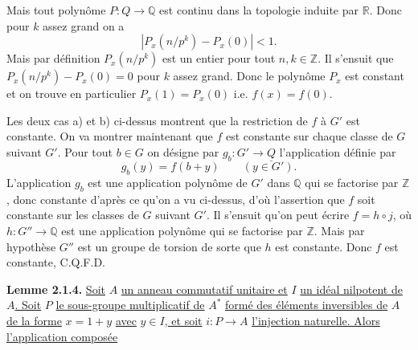 
Mais tout polynôme $P:Q\to\mathbb Q$ est continu dans la topologie induite par $\mathbb R$. Donc pour $k$ assez grand on a
\[
|P_x(n/p^k)-P_x(0)|<1.
\]
Mais par définition $P_x(n/p^k)$ est un entier pour tout $n,k\in\mathbb Z$. Il s'ensuit que $P_x(n/p^k)-P_x(0)=0$ pour $k$ assez grand. Donc le polynôme $P_x$ est constant et on trouve en particulier $P_x(1)=P_x(0)$ i.e. $f(x)=f(0)$.

Les deux cas a) et b) ci-dessus montrent que la restriction de $f$ à $G'$ est constante. On va montrer maintenant que $f$ est constante sur chaque classe de $G$ suivant $G'$. Pour tout $b\in G$ on désigne par $g_b:G'\to\underline{Q}$ l'application définie par
\[
g_b(y)=f(b+y)\qquad(y\in G').
\]
L'application $g_b$ est une application polynôme de $G'$ dans $\mathbb Q$ qui se factorise par $\mathbb Z$, donc constante d'après ce qu'on a vu ci-dessus, d'où l'assertion que $f$ soit constante sur les classes de $G$ suivant $G'$. Il s'ensuit qu'on peut écrire $f=h\circ j$, où $h:G''\to\mathbb Q$ est une application polynôme qui se factorise par $\mathbb Z$. Mais par hypothèse $G''$ est un groupe de torsion de sorte que $h$ est constante. Donc $f$ est constante, C.Q.F.D.

\textbf{Lemme 2.1.4.} \uline{Soit} $A$ \uline{un anneau commutatif unitaire et} $I$ \uline{un idéal nilpotent de} $A$\uline{. Soit} $P$ \uline{le sous-groupe multiplicatif de} $A^*$ \uline{formé des éléments inversibles de} $A$ \uline{de la forme} $x=1+y$ \uline{avec} $y\in I$\uline{, et soit} $i:P\to A$ \uline{l'injection naturelle. Alors l'application composée}
